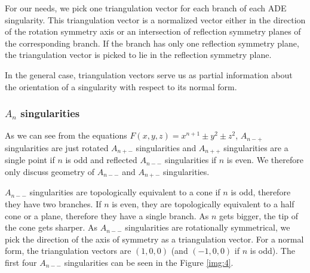 For our needs, we pick one triangulation vector for each branch of
each ADE singularity. This triangulation vector is a normalized vector
either in the direction
of the rotation symmetry axis or an intersection of reflection symmetry planes
of the corresponding branch. If the branch has only one reflection symmetry
plane, the triangulation vector is picked to lie in the reflection
symmetry plane.

In the general case, triangulation vectors serve us
as partial information about the orientation of a singularity with 
respect to its normal form.

\subsubsection*{$A_n$ singularities}

As we can see from the equations 
$F(x,y,z)=x^{n+1}\pm y^2\pm z^2$, $A_{n-+}$
singularities are just rotated $A_{n+-}$ singularities and $A_{n++}$ singularities 
are a single point if $n$ is odd and reflected $A_{n--}$ singularities if $n$ is even. 
We therefore only discuss geometry of $A_{n--}$ and $A_{n+-}$ singularities.

$A_{n--}$ singularities are topologically equivalent to a cone if $n$ is odd, therefore
they have two branches.
If $n$ is even, they are topologically equivalent to a half cone or a plane, therefore
they have a single branch.
As $n$ gets bigger, the tip of the cone gets sharper. As $A_{n--}$ singularities
are rotationally symmetrical, we pick the direction of
the axis of symmetry as a triangulation vector. For a normal form, the triangulation vectors
are $(1, 0, 0)$ (and $(-1, 0, 0)$ if $n$ is odd).
The first four $A_{n--}$ singularities can be seen in the Figure \ref{img:4}.

